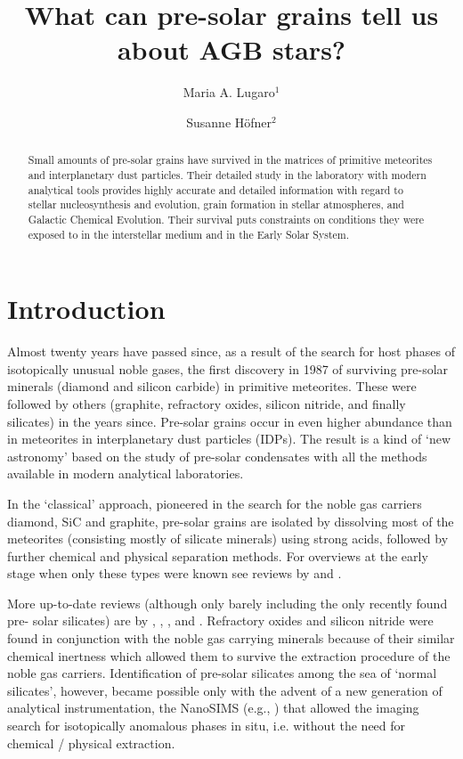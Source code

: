 \documentclass{iau}
\title[JD 11.~~Pre-solar grains and AGB stars] %
{What can pre-solar grains tell us \\ about AGB stars?}
\author[Maria A. Lugaro \& Susanne H{\"o}fner]   %
{Maria A. Lugaro$^1$
 \and Susanne H{\"o}fner$^2$}
\affiliation{$^1$Sterrenkundig Instituut, University of Utrecht, \\ Postbus 80000,
NL-3508TA, Utrecht, the Netherlands \\ email: {\tt m.lugaro@phys.uu.nl} \\[\affilskip]
$^2$Dept. of Astronomy \& Space Physics, Uppsala University, \\ Box
515, SE-75120 Uppsala, Sweden \\email: {\tt hoefner@astro.uu.se}}
\begin{document}
\maketitle

\begin{abstract}
Small amounts of pre-solar grains have survived in the matrices of primitive meteorites
and interplanetary dust particles. Their detailed study in the laboratory with modern
analytical tools provides highly accurate and detailed information with regard to stellar
nucleosynthesis and evolution, grain formation in stellar atmospheres, and Galactic
Chemical Evolution. Their survival puts constraints on conditions they were exposed
to in the interstellar medium and in the Early Solar System.
\end{abstract}

\firstsection %
\section{Introduction}

Almost twenty years have passed since, as a result of the search for host phases of
isotopically unusual noble gases, the first discovery in 1987 of surviving pre-solar minerals
(diamond and silicon carbide) in primitive meteorites. These were followed by others
(graphite, refractory oxides, silicon nitride, and finally silicates) in the years since. Pre-solar
grains occur in even higher abundance than in meteorites in interplanetary dust particles
(IDPs). The result is a kind of `new astronomy' based on the study of pre-solar condensates
with all the methods available in modern analytical laboratories.

In the `classical' approach, pioneered in the search for the noble gas carriers diamond,
SiC and graphite, pre-solar grains are isolated by dissolving most of the meteorites (consisting
mostly of silicate minerals) using strong acids, followed by further chemical and physical
separation methods. For overviews at the early stage when only these types were known see
reviews by 
\cite[Anders \& Zinner (1993)]{AndersZinner93} and 
\cite[Ott (1993)]{Ott93}.

More up-to-date reviews (although only barely including the only recently found pre-
solar silicates) are by 
\cite[Zinner (1998)]{Zinner98}, 
\cite[Hoppe \& Zinner (2000)]{HoppeZinner00}, 
\cite[Nittler (2003)]{Nittler03}, and 
\cite[Zinner (2004)]{Zinner04}. 
Refractory oxides and silicon nitride were found in conjunction with the noble gas
carrying minerals because of their similar chemical inertness which allowed them to survive
the extraction procedure of the noble gas carriers. Identification of pre-solar silicates among
the sea of `normal silicates', however, became possible only with the advent of a new
generation of analytical instrumentation, the NanoSIMS (e.g., 
\cite[Hoppe et al. 2004]{Hoppe_etal04}) that allowed
the imaging search for isotopically anomalous phases in situ, i.e. without the need for
chemical / physical extraction.
\end{document}
